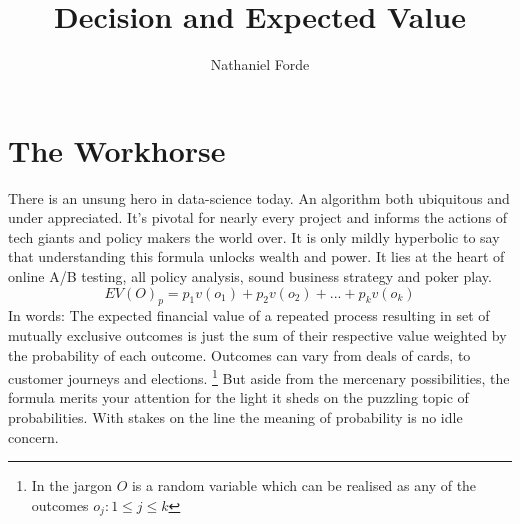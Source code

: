 \documentclass[10pt,a4paper,notitlepage, twocolumn]{article}
\author{Nathaniel Forde}
\title{Decision and Expected Value}
\begin{document}
\section*{The Workhorse}

There is an unsung hero in data-science today. An algorithm  both ubiquitous and under appreciated. It's pivotal for nearly every project and informs the actions of tech giants and policy makers the world over. It is only mildly hyperbolic to say that understanding this formula unlocks wealth and power. It lies at the heart of online A/B testing, all policy analysis, sound business strategy and poker play.
$$ EV(O)_{p} = p_{1}v(o_{1}) + p_{2}v(o_{2}) + ... + p_{k}v(o_{k}) $$
In words: The expected financial value of a repeated process resulting in set of mutually exclusive outcomes is just the sum of their respective value weighted by the probability of each outcome. Outcomes can vary from deals of cards, to customer journeys and elections. \footnote{In the jargon $O$ is a random variable which can be realised as any of the outcomes  $ o_{j} :  1 \leq j \leq k$} 
But aside from the mercenary possibilities, the formula merits your attention for the light it sheds on the puzzling topic of probabilities. With stakes on the line the meaning of probability is no idle concern.
\end{document}
